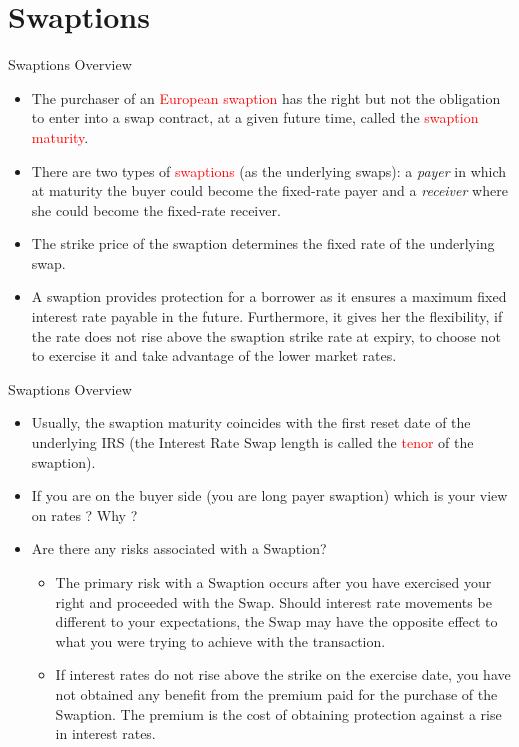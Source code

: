 \documentclass{beamer}
\begin{document}
\section{Swaptions}
\begin{frame}{Swaptions Overview}
\begin{itemize}
	\item<1-> The purchaser of an \textcolor{red}{European swaption} has the right but not the obligation to enter into a swap contract, at a given future time, called the \textcolor{red}{swaption maturity}.
	\item<2-> There are two types of \textcolor{red}{swaptions} (as the underlying swaps): a \emph{payer} in which at maturity the buyer could become the fixed-rate payer and a \emph{receiver} where she could become the fixed-rate receiver.
	\item <3-> The strike price of the swaption determines the fixed rate of the underlying swap.
	\item<4-> A swaption provides protection for a borrower as it ensures a maximum fixed interest rate payable in the future. Furthermore, it gives her the flexibility, if the rate does not rise above the swaption strike rate at expiry, to choose not to exercise it and take advantage of the lower market rates.
\end{itemize}
\end{frame}

\begin{frame}{Swaptions Overview}
	\begin{itemize}
	\item<1-> Usually, the swaption maturity coincides with the first reset date of the underlying IRS (the Interest Rate Swap length is called the \textcolor{red}{tenor} of the swaption).	
	\item<2-> If you are on the buyer side (you are long payer swaption) which is your view on rates ? Why ?
	\item<2-> Are there any risks associated with a Swaption?
	\begin{itemize}
		\item<3-> The primary risk with a Swaption occurs after you have exercised your right and proceeded with the Swap. Should interest rate movements be different to your expectations, the Swap may have the opposite effect to what you were trying to achieve with the transaction. 
		\item<3-> If interest rates do not rise above the strike on the exercise date, you have not obtained any benefit from the premium paid for the purchase of the Swaption. The premium is the cost of obtaining protection against a rise in interest rates.
	\end{itemize}
\end{itemize}
\end{frame}
\end{document}
